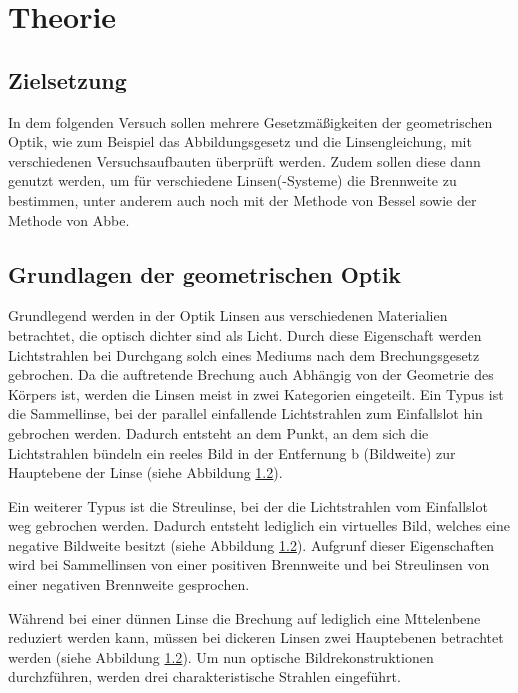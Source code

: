



\section{Theorie}

\subsection{Zielsetzung}

In dem folgenden Versuch sollen mehrere Gesetzmäßigkeiten der geometrischen Optik,
wie zum Beispiel das Abbildungsgesetz und die Linsengleichung, mit verschiedenen
Versuchsaufbauten überprüft werden. Zudem sollen diese dann genutzt werden, um
für verschiedene Linsen(-Systeme) die Brennweite zu bestimmen, unter anderem auch
noch mit der Methode von Bessel sowie der Methode von Abbe.

\subsection{Grundlagen der geometrischen Optik}

Grundlegend werden in der Optik Linsen aus verschiedenen Materialien betrachtet,
die optisch dichter sind als Licht. Durch diese Eigenschaft werden Lichtstrahlen
bei Durchgang solch eines Mediums nach dem Brechungsgesetz gebrochen. Da die
auftretende Brechung auch Abhängig von der Geometrie des Körpers ist, werden
die Linsen meist in zwei Kategorien eingeteilt. Ein Typus ist die Sammellinse, bei
der parallel einfallende Lichtstrahlen zum Einfallslot hin gebrochen werden.
Dadurch entsteht an dem Punkt, an dem sich die Lichtstrahlen bündeln ein reeles
Bild in der Entfernung b (Bildweite) zur Hauptebene der Linse (siehe Abbildung
\ref{}).

Ein weiterer Typus ist die Streulinse, bei der die Lichtstrahlen vom Einfallslot
weg gebrochen werden. Dadurch entsteht lediglich ein virtuelles Bild, welches
eine negative Bildweite besitzt (siehe Abbildung \ref{}). Aufgrunf dieser
Eigenschaften wird bei Sammellinsen von einer positiven Brennweite und bei
Streulinsen von einer negativen Brennweite gesprochen.

Während bei einer dünnen Linse die Brechung auf lediglich eine Mttelenbene reduziert
werden kann, müssen bei dickeren Linsen zwei Hauptebenen betrachtet werden (siehe
Abbildung \ref{}). Um nun optische Bildrekonstruktionen durchzführen, werden
drei charakteristische Strahlen eingeführt.

